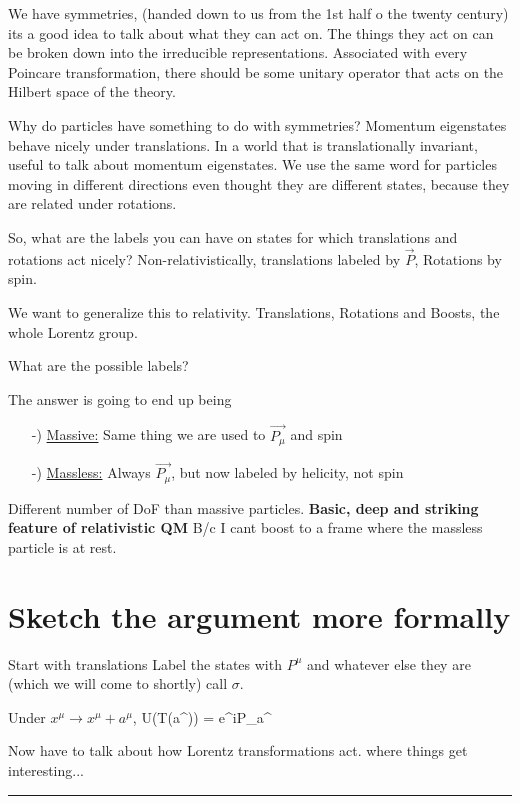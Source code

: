 {We have symmetries, (handed down to us from the 1st half o the twenty century) its a good idea to talk about what they can act on.
The things they act on can be broken down into the irreducible representations.
Associated with every Poincare transformation, there should be some unitary operator that acts on the Hilbert space of the theory.


Why do particles have something to do with symmetries?
Momentum eigenstates behave nicely under translations. 
In a world that is translationally invariant, useful to talk about momentum eigenstates. 
We use the same word for particles moving in different directions even thought they are different states, because they are related under rotations. 

So, what are the labels you can have on states for which translations and rotations act nicely?
Non-relativistically, translations labeled by $\vec{P}$, Rotations by spin. 

We want to generalize this to relativity. 
Translations, Rotations and Boosts, the whole Lorentz group.

What are the possible labels?

The answer is going to end up being
\begin{itemize}
\item[-)] \underline{Massive:} Same thing we are used to $\vec{P_\mu}$ and spin
\item[-)] \underline{Massless:} Always $\vec{P_\mu}$, but now labeled by helicity, not spin
\end{itemize}

Different number of DoF than massive particles.  
\textbf{Basic, deep and striking feature of relativistic QM}
B/c I cant boost to a frame where the massless particle is at rest.

\section*{Sketch the argument more formally}

Start with translations
\be
{}
\ee
Label the states with $P^\mu$ and whatever else they are (which we will come to shortly) call $\sigma$.

Under $x^\mu\rightarrow x^\mu + a^\mu$,
\be
U(T(a^\mu))  = e^{iP_\mu a^\mu}
\ee

Now have to talk about how Lorentz transformations act. 
where things get interesting...


\noindent\rule{\textwidth}{1pt}

}
